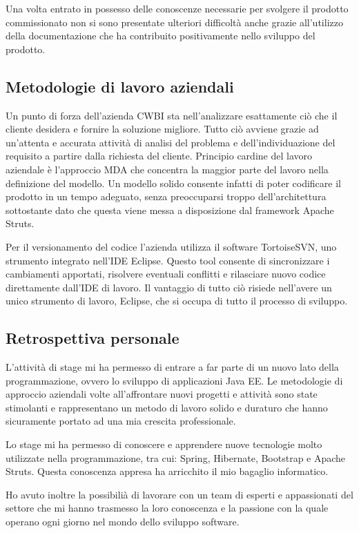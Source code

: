 \setlength{\parskip}{3ex}

\noindent Una volta entrato in possesso delle conoscenze necessarie per svolgere il prodotto commissionato non si sono presentate ulteriori difficoltà anche grazie all'utilizzo della documentazione che ha contribuito positivamente nello sviluppo del prodotto. 

\subsection{Metodologie di lavoro aziendali}
Un punto di forza dell'azienda CWBI sta nell'analizzare esattamente ciò che il cliente desidera e fornire la soluzione migliore. Tutto ciò avviene grazie ad un'attenta e accurata attività di analisi del problema e dell'individuazione del requisito a partire dalla richiesta del cliente. Principio cardine del lavoro aziendale è l'approccio MDA che concentra la maggior parte del lavoro nella definizione del modello. Un modello solido consente infatti di poter codificare il prodotto in un tempo adeguato, senza preoccuparsi troppo dell'architettura sottostante dato che questa viene messa a disposizione dal framework Apache Struts. 

\setlength{\parskip}{3ex}

\noindent Per il versionamento del codice l'azienda utilizza il software TortoiseSVN, uno strumento integrato nell'IDE Eclipse. Questo tool consente di sincronizzare i cambiamenti apportati, risolvere eventuali conflitti e rilasciare nuovo codice direttamente dall'IDE di lavoro. Il vantaggio di tutto ciò risiede nell'avere un unico strumento di lavoro, Eclipse, che si occupa di tutto il processo di sviluppo.

\subsection{Retrospettiva personale}
L'attività di stage mi ha permesso di entrare a far parte di un nuovo lato della programmazione, ovvero lo sviluppo di applicazioni Java EE. Le metodologie di approccio aziendali volte all'affrontare nuovi progetti e attività sono state stimolanti e rappresentano un metodo di lavoro solido e duraturo che hanno sicuramente portato ad una mia crescita professionale. 

\setlength{\parskip}{3ex}

\noindent Lo stage mi ha permesso di conoscere e apprendere nuove tecnologie molto utilizzate nella programmazione, tra cui: Spring, Hibernate, Bootstrap e Apache Struts. Questa conoscenza appresa ha arricchito il mio bagaglio informatico.

\setlength{\parskip}{3ex}

\noindent Ho avuto inoltre la possibilià di lavorare con un team di esperti e appassionati del settore che mi hanno trasmesso la loro conoscenza e la passione con la quale operano ogni giorno nel mondo dello sviluppo software.